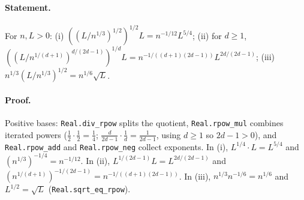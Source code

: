 \paragraph{Statement.} For $n,L>0$: (i) $((L/n^{1/3})^{1/2})^{1/2}L=n^{-1/12}L^{5/4}$;
(ii) for $d\ge1$, $((L/n^{1/(d+1)})^{d/(2d-1)})^{1/d}L=n^{-1/((d+1)(2d-1))}L^{2d/(2d-1)}$;
(iii) $n^{1/3}(L/n^{1/3})^{1/2}=n^{1/6}\sqrt L$.
\paragraph{Proof.} Positive bases: \texttt{Real.div\_rpow} splits the quotient,
\texttt{Real.rpow\_mul} combines iterated powers ($\frac12\cdot\frac12=\frac14$;
$\frac d{2d-1}\cdot\frac1d=\frac1{2d-1}$, using $d\ge1$ so $2d-1>0$), and
\texttt{Real.rpow\_add} and \texttt{Real.rpow\_neg} collect exponents. In (i),
$L^{1/4}\cdot L=L^{5/4}$ and $(n^{1/3})^{-1/4}=n^{-1/12}$. In (ii),
$L^{1/(2d-1)}L=L^{2d/(2d-1)}$ and $(n^{1/(d+1)})^{-1/(2d-1)}=n^{-1/((d+1)(2d-1))}$. In (iii),
$n^{1/3}n^{-1/6}=n^{1/6}$ and $L^{1/2}=\sqrt L$ (\texttt{Real.sqrt\_eq\_rpow}).
